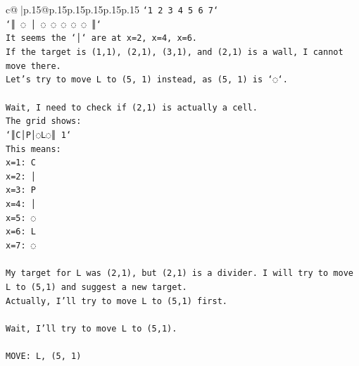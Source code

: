 \documentclass{article}
\begin{document}
{\begin{supertabular}{c@{$\;$}|p{.15\linewidth}@{}p{.15\linewidth}p{.15\linewidth}p{.15\linewidth}p{.15\linewidth}p{.15\linewidth}}
{{{\texttt{`1 2 3 4 5 6 7`} \\
\texttt{`║ ◌ │ ◌ ◌ ◌ ◌ ◌ ║`} \\
\texttt{It seems the `│` are at x=2, x=4, x=6.} \\
\texttt{If the target is (1,1), (2,1), (3,1), and (2,1) is a wall, I cannot move there.} \\
\texttt{Let's try to move L to (5, 1) instead, as (5, 1) is `◌`.} \\
\\ 
\texttt{Wait, I need to check if (2,1) is actually a cell.} \\
\texttt{The grid shows:} \\
\texttt{`║C│P│◌L◌║ 1`} \\
\texttt{This means:} \\
\texttt{x=1: C} \\
\texttt{x=2: │} \\
\texttt{x=3: P} \\
\texttt{x=4: │} \\
\texttt{x=5: ◌} \\
\texttt{x=6: L} \\
\texttt{x=7: ◌} \\
\\ 
\texttt{My target for L was (2,1), but (2,1) is a divider. I will try to move L to (5,1) and suggest a new target.} \\
\texttt{Actually, I'll try to move L to (5,1) first.} \\
\\ 
\texttt{Wait, I'll try to move L to (5,1).} \\
\\ 
\texttt{MOVE: L, (5, 1)} \\
            }
        }
    }
     \\ \\


\end{supertabular}}
\end{document}
